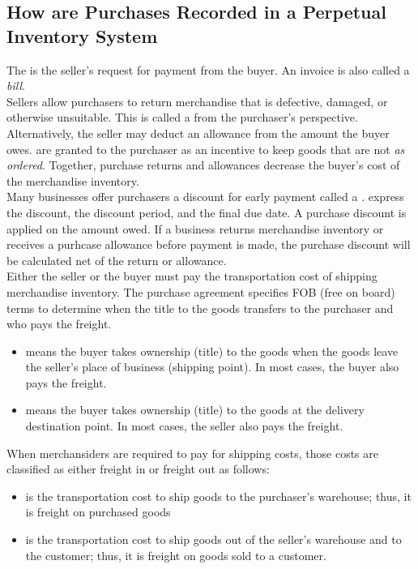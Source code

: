 \documentclass{article}
\begin{document}
\subsection{How are Purchases Recorded in a Perpetual Inventory System}

The  is the seller's request for payment from the buyer. An invoice is also called a \emph{bill}. \\ 

Sellers allow purchasers to return merchandise that is defective, damaged, or otherwise unsuitable. This is called a  from the purchaser's perspective. Alternatively, the seller may deduct an allowance from the amount the buyer owes.  are granted to the purchaser as an incentive to keep goods that are not \emph{as ordered}. Together, purchase returns and allowances decrease the buyer's cost of the merchandise inventory. \\ 

Many businesses offer purchasers a discount for early payment called a .  express the discount, the discount period, and the final due date. A purchase discount is applied on the amount owed. If a business returns merchandise inventory or receives a purhcase allowance before payment is made, the purchase discount will be calculated net of the return or allowance. \\ 

Either the seller or the buyer must pay the transportation cost of shipping merchandise inventory. The purchase agreement specifies FOB (free on board) terms to determine when the title to the goods transfers to the purchaser and who pays the freight. 
\begin{itemize}
  \item {} means the buyer takes ownership (title) to the goods when the goods leave the seller's place of business (shipping point). In most cases, the buyer also pays the freight. 
  \item {} means the buyer takes ownership (title) to the goods at the delivery destination point. In most cases, the seller also pays the freight. 
\end{itemize}
When merchansiders are required to pay for shipping costs, those costs are classified as either freight in or freight out as follows: 
\begin{itemize}
  \item {} is the transportation cost to ship goods to the purchaser's warehouse; thus, it is freight on purchased goods 
  \item {} is the transportation cost to ship goods out of the seller's warehouse and to the customer; thus, it is freight on goods sold to a customer. 
\end{itemize}
\end{document}

